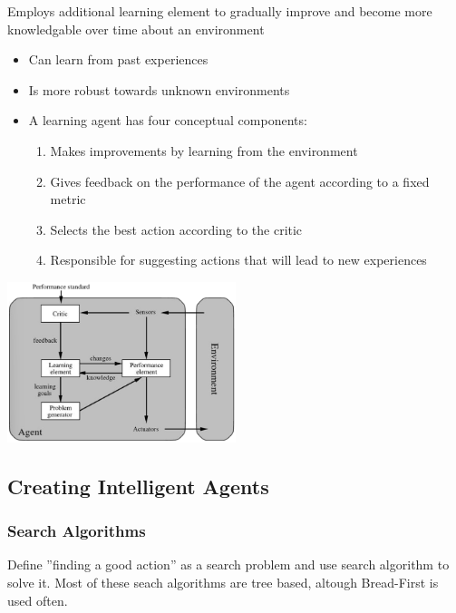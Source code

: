 \documentclass[
../../EiKI_Summary.tex,
]
{subfiles}
\begin{document}
\begin{defbox}
    Employs additional learning element to gradually improve and become more knowledgable over time about an environment
    \begin{itemize}
        \item Can learn from past experiences
        \item Is more robust towards unknown environments
        \item A learning agent has four conceptual components:
        \begin{enumerate}
            \item {} Makes improvements by learning from the environment
            \item {} Gives feedback on the performance of the agent according to a fixed metric
            \item {} Selects the best action according to the critic
            \item {} Responsible for suggesting actions that will lead to new experiences
        \end{enumerate}
    \end{itemize}

    \begin{center}
        \includegraphics[width=0.5\textwidth]{Pics/02/LearningAgent.png}
    \end{center}
\end{defbox}

\subsection{Creating Intelligent Agents}

\subsubsection{Search Algorithms}
Define ''finding a good action'' as a search problem and use search algorithm to solve it. Most of these seach algorithms are tree based, altough Bread-First is used often.
\end{document}

